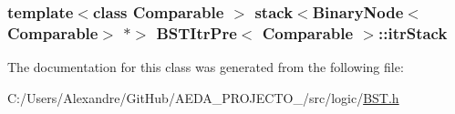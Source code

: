 \subsubsection[{itr\+Stack}]{\setlength{\rightskip}{0pt plus 5cm}template$<$class Comparable $>$ stack$<${\bf Binary\+Node}$<$Comparable$>$ $\ast$$>$ {\bf B\+S\+T\+Itr\+Pre}$<$ Comparable $>$\+::itr\+Stack\hspace{0.3cm}{\ttfamily [private]}}\label{class_b_s_t_itr_pre_a73e938d809acba06490472e7fc1bd6d3}


The documentation for this class was generated from the following file\+:\begin{DoxyCompactItemize}
\item 
C\+:/\+Users/\+Alexandre/\+Git\+Hub/\+A\+E\+D\+A\+\_\+\+P\+R\+O\+J\+E\+C\+T\+O\+\_/src/logic/\hyperlink{_b_s_t_8h}{B\+S\+T.\+h}\end{DoxyCompactItemize}

